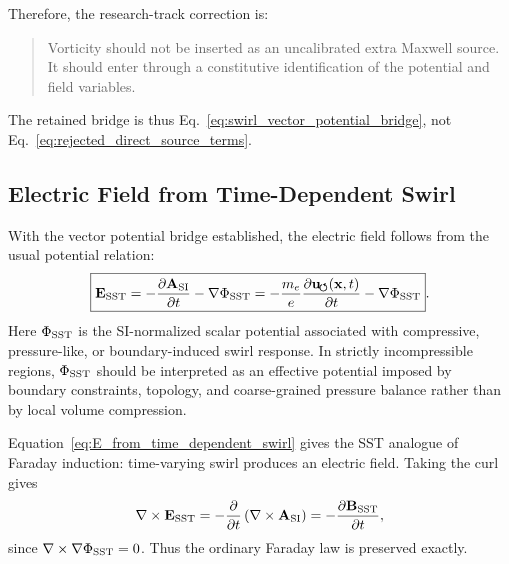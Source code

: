     Therefore, the research-track correction is:
    
    \begin{quote}
        Vorticity should not be inserted as an uncalibrated extra Maxwell source.
        It should enter through a constitutive identification of the potential and
        field variables.
    \end{quote}
    
    The retained bridge is thus Eq.~\eqref{eq:swirl_vector_potential_bridge},
    not Eq.~\eqref{eq:rejected_direct_source_terms}.

\subsection{Electric Field from Time-Dependent Swirl}
    
    With the vector potential bridge established, the electric field follows
    from the usual potential relation:
    \begin{equation}
        \boxed{
            \mathbf{E}_{\rm SST}
            =
            -\frac{\partial\mathbf{A}_{\rm SI}}{\partial t}
            -
            \nabla\Phi_{\rm SST}
            =
            -\frac{m_e}{e}
            \frac{\partial\mathbf{u}_{\!\boldsymbol{\circlearrowleft}}(\mathbf{x},t)}{\partial t}
            -
            \nabla\Phi_{\rm SST}
        } .
        \label{eq:E_from_time_dependent_swirl}
    \end{equation}
    Here \(\Phi_{\rm SST}\) is the SI-normalized scalar potential associated
    with compressive, pressure-like, or boundary-induced swirl response.  In
    strictly incompressible regions, \(\Phi_{\rm SST}\) should be interpreted
    as an effective potential imposed by boundary constraints, topology, and
    coarse-grained pressure balance rather than by local volume compression.
    
    Equation~\eqref{eq:E_from_time_dependent_swirl} gives the SST analogue of
    Faraday induction: time-varying swirl produces an electric field.  Taking
    the curl gives
    \begin{equation}
        \nabla\times\mathbf{E}_{\rm SST}
        =
        -
        \frac{\partial}{\partial t}
        \left(
            \nabla\times\mathbf{A}_{\rm SI}
        \right)
        =
        -
        \frac{\partial\mathbf{B}_{\rm SST}}{\partial t},
        \label{eq:faraday_from_swirl}
    \end{equation}
    since \(\nabla\times\nabla\Phi_{\rm SST}=0\).  Thus the ordinary Faraday
    law is preserved exactly.

